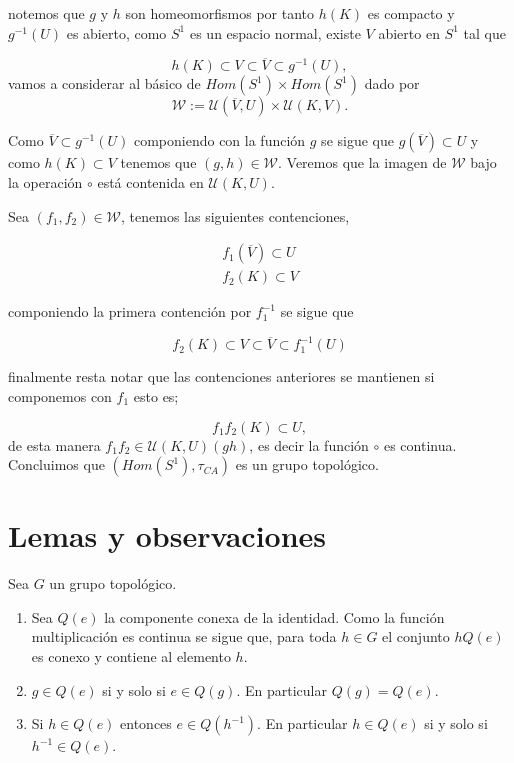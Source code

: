 notemos que $g$ y $h$ son homeomorfismos por tanto $h(K)$ es compacto y $g^{-1}(U)$ es abierto, como $S^1$ es un espacio normal, existe $V$ abierto en $S^1$ tal que 

$$h(K) \subset V \subset \overline{V} \subset g^{-1}(U),$$
vamos a considerar al básico de   $Hom(S^1) \times Hom(S^1)$ dado por  
$$\mathcal{W}:=\mathcal{U}(\overline{V},U) \times \mathcal{U}(K,V).$$

Como $\overline{V} \subset g^{-1}(U)$ componiendo con la función $g$ se sigue que $g(\overline{V}) \subset U$ y como $h(K) \subset V$ tenemos que $(g,h) \in \mathcal{W}$. Veremos que la imagen de $\mathcal{W}$ bajo la operación $\circ$ está contenida en $\mathcal{U}(K,U)$.


Sea $(f_1,f_2) \in \mathcal{W}$, tenemos las siguientes contenciones,  

\begin{align*}
f_1(\overline{V})\subset U \\
f_2(K)\subset V 
\end{align*}

componiendo la primera contención por $f_1^{-1}$ se sigue que

$$f_2(K) \subset V \subset \overline{V} \subset f_1^{-1}(U)$$

finalmente resta notar que las contenciones anteriores se mantienen si componemos con $f_1$ esto es;

$$f_1f_2(K) \subset U,$$
de esta manera $f_1f_2 \in \mathcal{U}(K,U)(gh)$, es decir la función $\circ$ es continua. Concluimos que $(Hom(S^1), \tau_{CA})$ es un grupo topológico. 



\section{Lemas y observaciones}

\begin{ob}
	Sea $G$ un grupo topológico.
	
	\begin{enumerate}
	\item Sea $Q(e)$ la componente conexa de la identidad. Como la función multiplicación es continua se sigue que, para toda $h \in G$ el conjunto $hQ(e)$ es conexo y contiene al elemento $h$.

 \item $g \in Q(e)$ si y solo si $e \in Q(g).$ En particular $Q(g)=Q(e)$.
 
 \item  Si $h \in Q(e)$ entonces $e \in Q(h^{-1})$. En particular $h \in Q(e)$ si y solo si $h^{-1}\in Q(e)$.
	\end{enumerate}
 \end{ob}	
 
